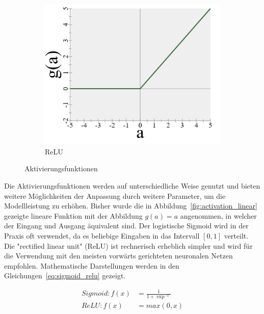 \begin{figure}
\begin{subfigure}[b]{0.3\textwidth}
        \includegraphics[width=\textwidth]{images/4_relu.png}
        \caption{ReLU}
        \label{fig:activation_relu}
    \end{subfigure}
    \caption{Aktivierungsfunktionen} %
    \label{fig:activation}
\end{figure}

Die Aktivierungsfunktionen werden auf unterschiedliche Weise genutzt und bieten weitere Möglichkeiten der Anpassung durch weitere Parameter, um die Modellleistung zu erhöhen.
Bisher wurde die in Abbildung~\ref{fig:activation_linear} gezeigte lineare Funktion mit der Abbildung $g(a) = a$ angenommen, in welcher der Eingang und Ausgang äquivalent sind.
Der logistische Sigmoid wird in der Praxis oft verwendet, da es beliebige Eingaben in das Intervall $[0,1]$ verteilt.
Die "rectified linear unit" (ReLU) ist rechnerisch erheblich simpler und wird für die Verwendung mit den meisten vorwärts gerichteten neuronalen Netzen \cite[S.169]{Goodfellow2017}\cite{Glorot2011} empfohlen.
Mathematische Darstellungen werden in den Gleichungen~\eqref{eq:sigmoid_relu} gezeigt.

\begin{equation}
    \begin{split}
        Sigmoid: f(x) & = \frac{1}{1 + \exp^{-x}} \\ ReLU: f(x) & = max(0, x)
    \end{split}
    \label{eq:sigmoid_relu}
\end{equation}

